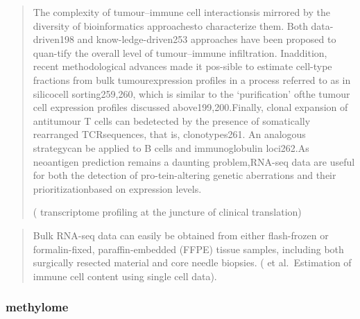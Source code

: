 \documentclass[12pt,]{book}
\theoremstyle{definition}
\theoremstyle{definition}
\theoremstyle{definition}
\theoremstyle{remark}
\begin{document}
\begin{quote}
The complexity of tumour--immune cell interactionsis mirrored by the
diversity of bioinformatics approachesto characterize them. Both
data-driven198 and know-ledge-driven253 approaches have been proposed to
quan-tify the overall level of tumour--immune infiltration. Inaddition,
recent methodological advances made it pos-sible to estimate cell-type
fractions from bulk tumourexpression profiles in a process referred to
as in silicocell sorting259,260, which is similar to the `purification'
ofthe tumour cell expression profiles discussed above199,200.Finally,
clonal expansion of antitumour T cells can bedetected by the presence of
somatically rearranged TCRsequences, that is, clonotypes261. An
analogous strategycan be applied to B cells and immunoglobulin
loci262.As neoantigen prediction remains a daunting problem,RNA-seq data
are useful for both the detection of pro-tein-altering genetic
aberrations and their prioritizationbased on expression levels.

(\citet{Cancer} transcriptome profiling at the juncture of clinical
translation)
\end{quote}

\begin{quote}
Bulk RNA-seq data can easily be obtained from either flash-frozen or
formalin-fixed, paraffin-embedded (FFPE) tissue samples, including both
surgically resected material and core needle biopsies. (\citet{Shelker}
et al.~Estimation of immune cell content using single cell data).
\end{quote}

\hypertarget{methylome}{%
\subsubsection{methylome}\label{methylome}}
\end{document}
